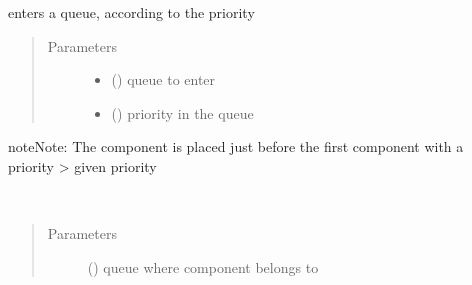 \documentclass[letterpaper,10pt,english]{sphinxmanual}
\begin{document}
\begin{fulllineitems}
\begin{fulllineitems}
\end{fulllineitems}


\begin{fulllineitems}
\label{\detokenize{Reference:salabim.Component.enter_sorted}}
enters a queue, according to the priority
\begin{quote}\begin{description}
\item[{Parameters}] \leavevmode\begin{itemize}
\item {} 
 ({\hyperref[\detokenize{Reference:salabim.Queue}]{}}) \textendash{} queue to enter

\item {} 
 () \textendash{} priority in the queue

\end{itemize}

\end{description}\end{quote}

\begin{sphinxadmonition}{note}{Note:}
The component is placed just before the first component with a priority \textgreater{} given priority
\end{sphinxadmonition}

\end{fulllineitems}


\begin{fulllineitems}
\label{\detokenize{Reference:salabim.Component.enter_time}}~\begin{quote}\begin{description}
\item[{Parameters}] \leavevmode
{} ({\hyperref[\detokenize{Reference:salabim.Queue}]{}}) \textendash{} queue where component belongs to


\end{description}
\end{quote}
\end{fulllineitems}
\end{fulllineitems}
\end{document}
